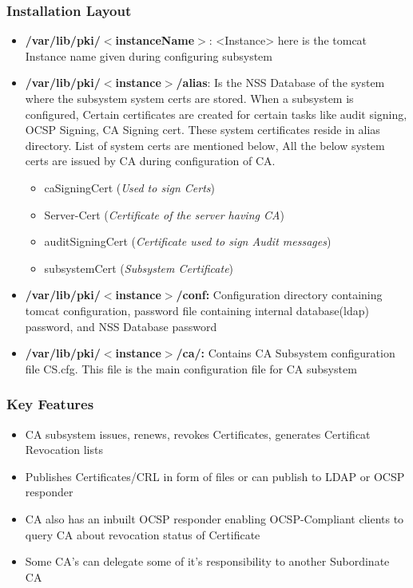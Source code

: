 \documentclass[a4paper]{article}
\begin{document}
\subsubsection{Installation Layout}
    \begin{itemize}
        \item \textbf{/var/lib/pki/$<$instanceName$>$}: <Instance> here is the tomcat Instance name given during configuring subsystem
        \item \textbf{/var/lib/pki/$<$instance$>$/alias}: Is the NSS Database of the system where the subsystem system certs are stored.
            When a subsystem is configured, Certain certificates are created for certain tasks like audit signing, OCSP Signing, CA Signing cert.
            These system certificates reside in alias directory. List of system certs are mentioned below, All the below system certs are issued by
            CA during configuration of CA.
            \begin{itemize}
                \item caSigningCert (\textit{Used to sign Certs})
                \item Server-Cert (\textit{Certificate of the server having CA})
                \item auditSigningCert (\textit{Certificate used to sign Audit messages})
                \item subsystemCert (\textit{Subsystem Certificate})
            \end{itemize}
        \item \textbf{/var/lib/pki/$<$instance$>$/conf:} Configuration directory containing
            tomcat configuration, password file containing internal database(ldap) password, 
            and NSS Database password
        \item \textbf{/var/lib/pki/$<$instance$>$/ca/:} Contains CA Subsystem configuration 
                file CS.cfg. This file is the main configuration file for CA subsystem
    \end{itemize}
\subsubsection{Key Features}
    \begin{itemize}
        \item CA subsystem issues, renews, revokes Certificates, generates Certificat Revocation lists
        \item Publishes Certificates/CRL in form of files or can publish to LDAP or OCSP responder
        \item CA also has an inbuilt OCSP responder enabling OCSP-Compliant clients to query CA about revocation status of Certificate
        \item Some CA's can delegate some of it's responsibility to another Subordinate CA
    \end{itemize}
\end{document}
